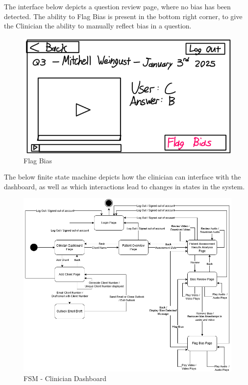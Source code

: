 \documentclass[12pt, titlepage]{article}
\begin{document}
\hspace{1.5em}The interface below depicts a question review page, where no bias has been detected. The ability to Flag Bias is present in the bottom right corner, to give the Clinician the ability to manually reflect bias in a question.
\begin{figure}[H]
  \centering
  \includegraphics[scale=0.9]{images/Flag-Bias.png}
  \caption{Flag Bias}
\end{figure}

\hspace{1.5em}The below finite state machine depicts how the clinician can interface with the dashboard, as well as which interactions lead to changes in states in the system.
\begin{figure}[H]
  \centering
  \includegraphics[scale=0.6]{images/FSM_Clinician_Dashboard.png}
  \caption{FSM - Clinician Dashboard}
\end{figure}
\end{document}
